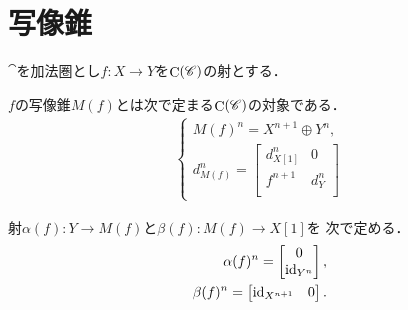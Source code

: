 \section{写像錐}
$\cat$を加法圏とし$f\colon X\to Y$を$\mathop{\mathrm{C}}\nolimits(\mathscr{C})$の射とする．
\begin{Definition}
    $f$の写像錐$M(f)$とは次で定まる$\mathop{\mathrm{C}}\nolimits(\mathscr{C})$の対象である．
    \begin{align*}
        \begin{cases}
            M(f)^n=X^{n+1}\oplus Y^{n},\\
            d^{n}_{M(f)}=\begin{bmatrix*}
                d_{X[1]}^n & 0\\
                f^{n+1} & d_Y^n\\
            \end{bmatrix*}
        \end{cases}
    \end{align*}
\end{Definition}

射$\alpha(f)\colon Y\to M(f)$と$\beta(f)\colon M(f)\to X[1]$を
次で定める．
\begin{align}
    \alpha(f)^{n}=\begin{bmatrix*}
        0\\\id_{Y^n}
    \end{bmatrix*},\\
    \beta(f)^{n}=\begin{bmatrix*}
        \id_{X^{n+1}}&0
    \end{bmatrix*}.
\end{align}

